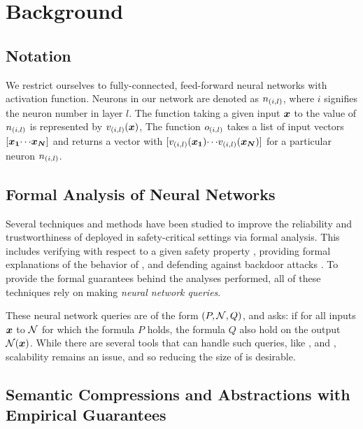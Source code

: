 \section{Background}
\subsection{Notation}

We restrict ourselves to fully-connected, feed-forward neural networks with
\relu activation function. 
Neurons in our network are denoted as $n_{(i,l)}$, where $i$ signifies the 
neuron number in layer $l$.  %
The function taking a given input $\boldsymbol{x}$ to the value of $n_{(i,l)}$ is
represented by $v_{(i,l)}(\boldsymbol{x})$, %
The function $o_{(i,l)}$ takes a list of input vectors
$[\boldsymbol{x_1} {\cdots} \boldsymbol{x_N}]$ and returns a vector with
$[v_{(i,l)}(\boldsymbol{x_1}) {\cdots} v_{(i,l)}(\boldsymbol{x_N})]$ for a particular
neuron $n_{(i,l)}$.  %

\subsection{Formal Analysis of Neural Networks }
\label{s:form-an}

Several techniques and methods have been studied to improve the reliability and
trustworthiness of \dnn deployed in safety-critical settings via formal
analysis. This includes verifying \dnn with respect to a given
safety property
\cite{reluplex,cegar-nn,deeppoly,cegarette,cleverest-nn,conv-abs-gk,deep-abstract,lin-comb-abs-jan},
providing formal explanations of
the behavior of \dnn \cite{minimal-image-fxai,overview-fxai}, and defending
against backdoor attacks \cite{backdoor-verification}.
 To provide the formal guarantees behind the
analyses performed, all of these techniques rely on making \textit{neural
network queries}. 

These neural network queries are of the form $(P, \mathcal{N}, Q)$, and asks: if
for all inputs $\boldsymbol{x}$ to $\mathcal{N}$ for which the formula $P$ holds, 
the formula $Q$ also hold on the output $\mathcal{N}(\boldsymbol{x})$. While there are
several
tools that can handle such queries, like \marabou, \abcrown and \neuralsat,
scalability remains an issue, and so reducing the size of \cnc is desirable.

\subsection{Semantic Compressions and Abstractions with Empirical Guarantees}
\label{s:emp-abs}

